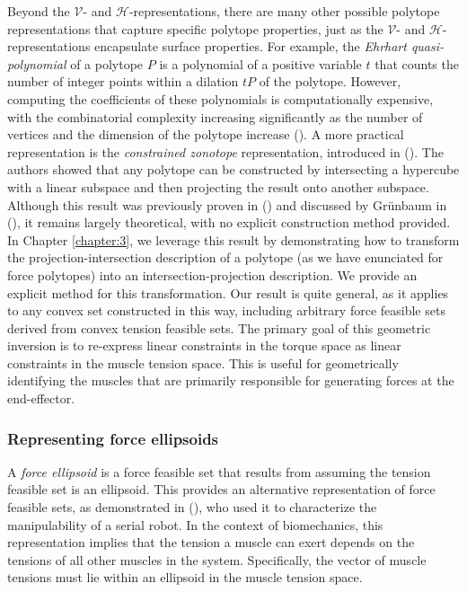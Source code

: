 Beyond the $\mathcal{V}$- and $\mathcal{H}$-representations, there are many other possible polytope representations that capture specific polytope properties, just as the $\mathcal{V}$- and $\mathcal{H}$-representations encapsulate surface properties. For example, the \emph{Ehrhart quasi-polynomial} of a polytope $P$ is a polynomial of a positive variable $t$ that counts the number of integer points within a dilation $tP$ of the polytope. However, computing the coefficients of these polynomials is computationally expensive, with the combinatorial complexity increasing significantly as the number of vertices and the dimension of the polytope increase (\cite{barvinokComputingEhrhartQuasipolynomial2005}). A more practical representation is the \emph{constrained zonotope} representation, introduced in (\cite{scottConstrainedZonotopesNew2016}). The authors showed that any polytope can be constructed by intersecting a hypercube with a linear subspace and then projecting the result onto another subspace. Although this result was previously proven in (\cite{naumannBeliebigeKonvexePolytope1956}) and discussed by Grünbaum in (\cite{grunbaumConvexPolytopes2013}), it remains largely theoretical, with no explicit construction method provided. In Chapter \ref{chapter:3}, we leverage this result by demonstrating how to transform the projection-intersection description of a polytope (as we have enunciated for force polytopes) into an intersection-projection description. We provide an explicit method for this transformation. Our result is quite general, as it applies to any convex set constructed in this way, including arbitrary force feasible sets derived from convex tension feasible sets. The primary goal of this geometric inversion is to re-express linear constraints in the torque space as linear constraints in the muscle tension space. This is useful for geometrically identifying the muscles that are primarily responsible for generating forces at the end-effector.

\subsubsection*{Representing force ellipsoids}
A \emph{force ellipsoid} is a force feasible set that results from assuming the tension feasible set is an ellipsoid. This provides an alternative representation of force feasible sets, as demonstrated in (\cite{chiacchioForcePolytopeForce1997}), who used it to characterize the manipulability of a serial robot. In the context of biomechanics, this representation implies that the tension a muscle can exert depends on the tensions of all other muscles in the system. Specifically, the vector of muscle tensions must lie within an ellipsoid in the muscle tension space.

